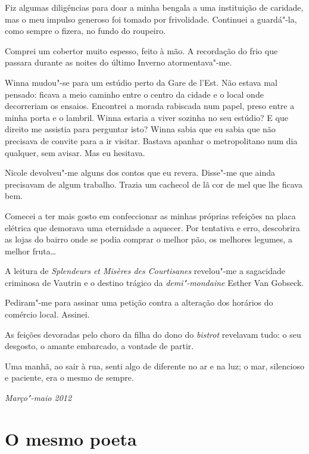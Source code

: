 Fiz algumas diligências para doar a minha bengala a uma instituição de
caridade, mas o meu impulso generoso foi tomado por frivolidade.
Continuei a guardá"-la, como sempre o fizera, no fundo do roupeiro.

Comprei um cobertor muito espesso, feito à mão. A recordação do frio
que passara durante as noites do último Inverno atormentava"-me.

Winna mudou"-se para um estúdio perto da Gare de l'Est. Não estava mal
pensado: ficava a meio caminho entre o centro da cidade e o local onde
decorreriam os ensaios. Encontrei a morada rabiscada num papel, preso
entre a minha porta e
o lambril. Winna estaria a viver sozinha no seu estúdio? E que direito
me assistia para perguntar isto? Winna sabia que eu sabia que não
precisava de convite para a ir visitar. Bastava apanhar o metropolitano
num dia qualquer, sem avisar. Mas eu hesitava.

Nicole devolveu"-me alguns dos contos que eu revera. Disse"-me que ainda
precisavam de algum trabalho. Trazia um cachecol de lã cor de mel que
lhe ficava bem.

Comecei a ter mais gosto em confeccionar as minhas próprias refeições na
placa elétrica que demorava uma eternidade a aquecer. Por tentativa e
erro, descobrira as lojas do bairro onde se podia comprar o melhor pão,
os melhores legumes, a melhor fruta\ldots{}

A leitura de \emph{Splendeurs et Misères des Courtisanes }revelou"-me a sagacidade criminosa de Vautrin e o destino trágico da
\emph{demi"-mondaine }Esther Van Gobseck.

Pediram"-me para assinar uma petição contra a alteração dos horários do
comércio local. Assinei.

As feições devoradas pelo choro da filha do dono do \emph{bistrot
}revelavam tudo: o seu desgosto, o amante embarcado, a vontade de
partir.

Uma manhã, ao sair à rua, senti algo de diferente no ar e na luz; o mar,
silencioso e paciente, era o mesmo de sempre.

\begin{flushright}
\emph{Março"-maio 2012}
\end{flushright}

\chapter{O mesmo poeta}

